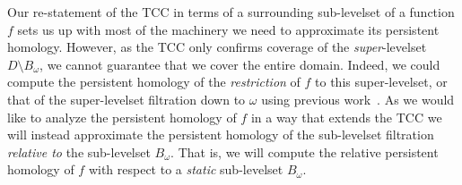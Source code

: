 
Our re-statement of the TCC in terms of a surrounding sub-levelset of a function $f$ sets us up with most of the machinery we need to approximate its persistent homology.
However, as the TCC only confirms coverage of the \emph{super}-levelset $D\setminus B_\omega$, we cannot guarantee that we cover the entire domain.
Indeed, we could compute the persistent homology of the \emph{restriction} of $f$ to this super-levelset, or that of the super-levelset filtration down to $\omega$ using previous work~\cite{chazal09analysis}.
As we would like to analyze the persistent homology of $f$ in a way that extends the TCC we will instead approximate the persistent homology of the sub-levelset filtration \emph{relative to} the sub-levelset $B_\omega$.
That is, we will compute the relative persistent homology of $f$ with respect to a \emph{static} sub-levelset $B_\omega$.

